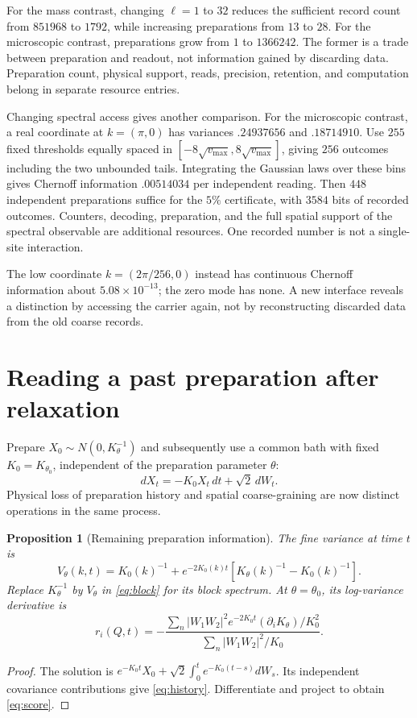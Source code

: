 \documentclass[12pt,a4paper]{article}
\newtheorem{proposition}[theorem]{Proposition}
\begin{document}
For the mass contrast, changing $\ell=1$ to $32$ reduces the sufficient
record count from $851968$ to $1792$, while increasing preparations
from $13$ to $28$. For the microscopic contrast, preparations grow from
$1$ to $1366242$. The former is a trade between preparation and readout,
not information gained by discarding data. Preparation count, physical
support, reads, precision, retention, and computation belong in
separate resource entries.

Changing spectral access gives another comparison. For the microscopic
contrast, a real coordinate at $k=(\pi,0)$ has variances $.24937656$
and $.18714910$. Use $255$ fixed thresholds equally spaced in
$[-8\sqrt{v_{\max}},8\sqrt{v_{\max}}]$, giving $256$ outcomes including
the two unbounded tails. Integrating the Gaussian laws over these bins
gives Chernoff information $.00514034$ per independent reading.
Then $448$ independent preparations suffice for the $5\%$ certificate,
with $3584$ bits of recorded outcomes. Counters, decoding, preparation,
and the full spatial support of the spectral observable are additional
resources. One recorded number is not a single-site interaction.

The low coordinate $k=(2\pi/256,0)$ instead has continuous Chernoff
information about $5.08\times10^{-13}$; the zero mode has none.
A new interface reveals a distinction by accessing the carrier again,
not by reconstructing discarded data from the old coarse records.

\section{Reading a past preparation after relaxation}

Prepare $X_0\sim N(0,K_\theta^{-1})$ and subsequently use a common bath
with fixed $K_0=K_{\theta_0}$, independent of the preparation parameter
$\theta$:
\begin{equation}
 dX_t=-K_0X_t\,dt+\sqrt2\,dW_t.
 \label{eq:OU}
\end{equation}
Physical loss of preparation history and spatial coarse-graining are
now distinct operations in the same process.

\begin{proposition}[Remaining preparation information]
The fine variance at time $t$ is
\begin{equation}
 V_\theta(k,t)=K_0(k)^{-1}+e^{-2K_0(k)t}
 [K_\theta(k)^{-1}-K_0(k)^{-1}].
 \label{eq:history}
\end{equation}
Replace $K_\theta^{-1}$ by $V_\theta$ in \eqref{eq:block} for its block
spectrum. At $\theta=\theta_0$, its log-variance derivative is
\begin{equation}
 r_i(Q,t)=-
 \frac{\sum_n |W_1W_2|^2e^{-2K_0t}(\partial_iK_\theta)/K_0^2}
 {\sum_n |W_1W_2|^2/K_0}.
 \label{eq:score}
\end{equation}
\end{proposition}
\begin{proof}
The solution is
$e^{-K_0t}X_0+\sqrt2\int_0^t e^{-K_0(t-s)}dW_s$.
Its independent covariance contributions give \eqref{eq:history}.
Differentiate and project to obtain \eqref{eq:score}.
\end{proof}
\end{document}
